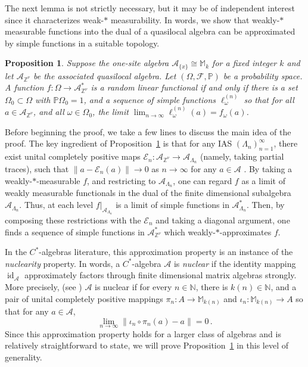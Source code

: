 \documentclass{article}
\DeclareMathOperator{\id}{id}
\newcommand{\Znu}{\mathbb{Z}^\nu}
\newcommand{\A}{\mathcal{A}}
\newcommand{\M}{\mathbb{M}}
\newcommand{\N}{\mathbb N}
\renewcommand{\P}{\mathbb{P}}
\newcommand{\<}{\langle}
\renewcommand{\>}{\rangle}
\newtheorem{prop}[thm]{Proposition}
\theoremstyle{definition}
\numberwithin{equation}{section}
\begin{document}
The next lemma is not strictly necessary, but it may be of independent interest since it characterizes weak-$\ast$ measurability. In words, we show that weakly-$\ast$ measurable functions into the dual of a quasilocal algebra can be approximated by simple functions in a suitable topology. 

\begin{prop}\label{prop:w*_simple_functions}
    Suppose the one-site algebra $\A_{\{x\}}\cong \M_k$ for a fixed integer $k$ and let $\A_{\Znu}$ be the associated quasilocal algebra. Let $(\Omega, \mathcal{F}, \P)$ be a probability space. A function $f:\Omega \to \A_{\Znu}^*$ is a random linear functional if and only if there is a set $\Omega_0\subset \Omega$ with $\P\Omega_0 = 1$, and a sequence of simple functions $\ell^{(n)}_\omega$ so that for all $a\in \A_{\Znu}$, and all $\omega \in \Omega_0$, the limit $\lim_{n\to \infty} \ell^{(n)}_\omega(a) = f_\omega(a)$. 
\end{prop}

Before beginning the proof, we take a few lines to discuss the main idea of the proof. The key ingredient of Proposition~\ref{prop:w*_simple_functions} is that for any IAS $(\Lambda_n)_{n=1}^\infty$, there exist unital completely positive maps $\mathcal{E}_n:\A_{\Znu} \to \A_{\Lambda_n}$ (namely, taking partial traces), such that $\|a - \mathcal{E}_n(a)\| \to 0$ as $n\to \infty$ for any $a\in \A$ \cite{NachtergaeleScholzWerner,NachtergaeleSimsYoung}. By taking a weakly-$\ast$-measurable $f$, and restricting to $\A_{\Lambda_n}$, one can regard $f$ as a limit of weakly measurable functionals in the dual of the finite dimensional subalgebra $\A_{\Lambda_n}$. Thus, at each level $f|_{\A_{\Lambda_n}}$ is a limit of simple functions in $\A_{\Lambda_n}^*$. Then, by composing these restrictions with the $\mathcal{E}_n$ and taking a diagonal argument, one finds a sequence of simple functions in $\A_{\Znu}^*$ which weakly-$\ast$-approximates $f$. 


In the $C^*$-algebras literature, this approximation property is an instance of the \emph{nuclearity} property. In words, a $C^*$-algebra $\A$ is \emph{nuclear} if the identity mapping $\id_{\A}$ approximately factors through finite dimensional matrix algebras strongly. More precisely, (see \cite[Proposition 2.2.6]{BrownOzawa})  $\A$ is nuclear if for every $n\in \N$, there is $k(n)\in \N$, and a pair of unital completely positive mappings $\pi_n:A\to \M_{k(n)}$ and $\iota_n:\M_{k(n)}\to A$ so that for any $a\in \A$, 
\begin{equation}\label{eqn:nuclear}
    \lim_{n\to \infty} \|\iota_n \circ \pi_n(a) - a\| = 0\,.
\end{equation}  Since this approximation property holds for a larger class of algebras and is relatively straightforward to state, we will prove Proposition~\ref{prop:w*_simple_functions} in this level of generality.
\end{document}
